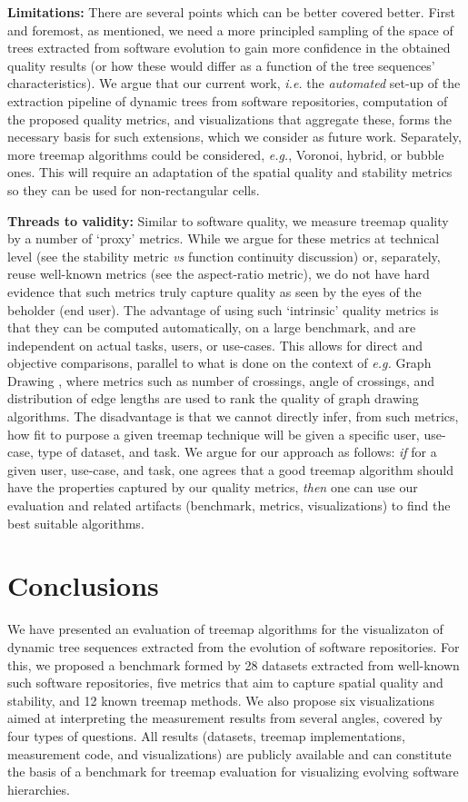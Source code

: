 \noindent\textbf{Limitations:} There are several points which can be better covered better. First and foremost, as mentioned, we need a more principled sampling of the space of trees extracted from software evolution to gain more confidence in the obtained quality results (or how these would differ as a function of the tree sequences' characteristics). We argue that our current work, \emph{i.e.} the \emph{automated} set-up of the extraction pipeline of dynamic trees from software repositories, computation of the proposed quality metrics, and visualizations that aggregate these, forms the necessary basis for such extensions, which we consider as future work. Separately, more treemap algorithms could be considered, \emph{e.g.}, Voronoi, hybrid, or bubble ones. This will require an adaptation of the spatial quality and stability metrics so they can be used for non-rectangular cells. 

\noindent\textbf{Threads to validity:} Similar to software quality, we measure treemap quality by a number of `proxy' metrics. While we argue for these metrics at technical level (see the stability metric \emph{vs} function continuity discussion) or, separately, reuse well-known metrics (see the aspect-ratio metric), we do not have hard evidence that such metrics truly capture quality as seen by the eyes of the beholder (end user). The advantage of using such `intrinsic' quality metrics is that they can be computed automatically, on a large benchmark, and are independent on actual tasks, users, or use-cases. This allows for direct and objective comparisons, parallel to what is done on the context of \emph{e.g.}  Graph Drawing \citep{hachul,battista}, where metrics such as number of crossings, angle of crossings, and distribution of edge lengths are used to rank the quality of graph drawing algorithms. 
The disadvantage is that we cannot directly infer, from such metrics, how fit to purpose a given treemap technique will be given a specific user, use-case, type of dataset, and task. We argue for our approach as follows: \emph{if} for a given user, use-case, and task, one agrees that a good treemap algorithm should have the properties captured by our quality metrics, \emph{then} one can use our evaluation and related artifacts (benchmark, metrics, visualizations) to find the best suitable algorithms.


\section{Conclusions}
\label{sec:conclusions}
%
We have presented an evaluation of treemap algorithms for the visualizaton of dynamic tree sequences extracted from the evolution of software repositories. For this, we proposed a benchmark formed by 28 datasets extracted from well-known such software repositories, five metrics that aim to capture spatial quality and stability, and 12 known treemap methods. We also propose six visualizations aimed at interpreting the measurement results from several angles, covered by four types of questions. All results (datasets, treemap implementations, measurement code, and visualizations) are publicly available and can constitute the basis of a benchmark for treemap evaluation for visualizing evolving software hierarchies. 

